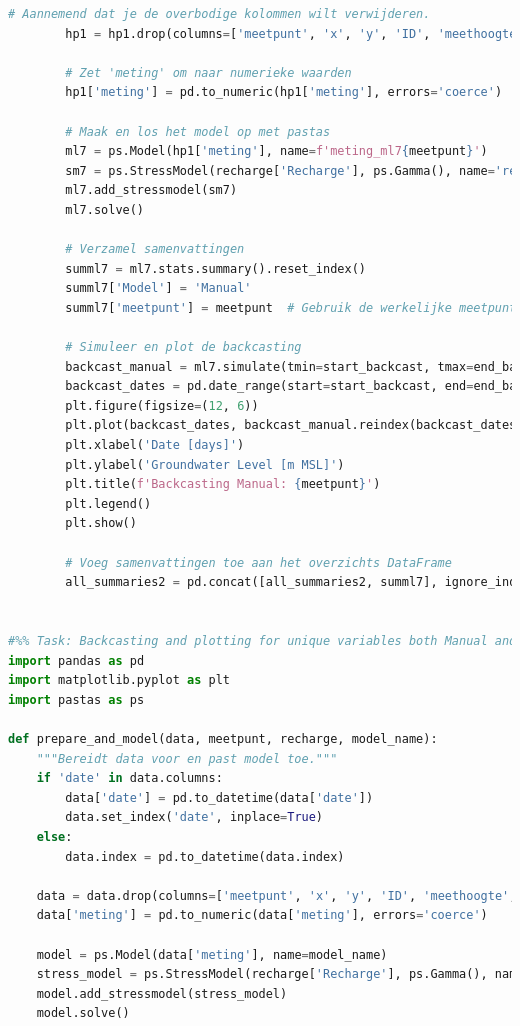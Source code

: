 \begin{lstlisting}[language=Python]
        # Aannemend dat je de overbodige kolommen wilt verwijderen.
        hp1 = hp1.drop(columns=['meetpunt', 'x', 'y', 'ID', 'meethoogte'], errors='ignore')

        # Zet 'meting' om naar numerieke waarden
        hp1['meting'] = pd.to_numeric(hp1['meting'], errors='coerce')

        # Maak en los het model op met pastas
        ml7 = ps.Model(hp1['meting'], name=f'meting_ml7{meetpunt}')
        sm7 = ps.StressModel(recharge['Recharge'], ps.Gamma(), name='recharge', settings='evap')
        ml7.add_stressmodel(sm7)
        ml7.solve()

        # Verzamel samenvattingen
        summl7 = ml7.stats.summary().reset_index()
        summl7['Model'] = 'Manual'
        summl7['meetpunt'] = meetpunt  # Gebruik de werkelijke meetpuntwaarde

        # Simuleer en plot de backcasting
        backcast_manual = ml7.simulate(tmin=start_backcast, tmax=end_backcast)
        backcast_dates = pd.date_range(start=start_backcast, end=end_backcast, freq='D')
        plt.figure(figsize=(12, 6))
        plt.plot(backcast_dates, backcast_manual.reindex(backcast_dates), label='Manual', color='cyan')
        plt.xlabel('Date [days]')
        plt.ylabel('Groundwater Level [m MSL]')
        plt.title(f'Backcasting Manual: {meetpunt}')
        plt.legend()
        plt.show()

        # Voeg samenvattingen toe aan het overzichts DataFrame
        all_summaries2 = pd.concat([all_summaries2, summl7], ignore_index=True)


#%% Task: Backcasting and plotting for unique variables both Manual and Datalogger.
import pandas as pd
import matplotlib.pyplot as plt
import pastas as ps

def prepare_and_model(data, meetpunt, recharge, model_name):
    """Bereidt data voor en past model toe."""
    if 'date' in data.columns:
        data['date'] = pd.to_datetime(data['date'])
        data.set_index('date', inplace=True)
    else:
        data.index = pd.to_datetime(data.index)
    
    data = data.drop(columns=['meetpunt', 'x', 'y', 'ID', 'meethoogte', 'waarneming'], errors='ignore')
    data['meting'] = pd.to_numeric(data['meting'], errors='coerce')
    
    model = ps.Model(data['meting'], name=model_name)
    stress_model = ps.StressModel(recharge['Recharge'], ps.Gamma(), name='recharge', settings='evap')
    model.add_stressmodel(stress_model)
    model.solve()
    

\end{lstlisting}
